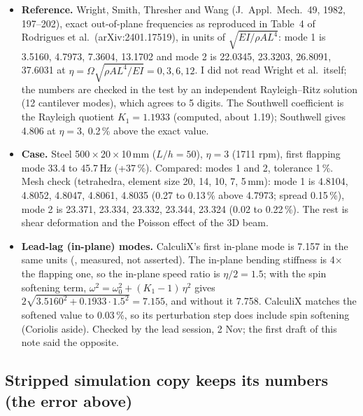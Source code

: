 \begin{itemize}[nosep]
  \item \textbf{Reference.} Wright, Smith, Thresher and Wang (J.\ Appl.\ Mech.\ 49, 1982, 197--202), exact out-of-plane
        frequencies as reproduced in Table~4 of Rodrigues et al.\ (arXiv:2401.17519), in units of
        $\sqrt{EI/\rho A L^4}$: mode 1 is 3.5160, 4.7973, 7.3604, 13.1702 and mode 2 is 22.0345, 23.3203, 26.8091, 37.6031 at
        $\eta=\Omega\sqrt{\rho A L^4/EI}=0,3,6,12$. I did not read Wright et al.\ itself; the numbers are checked
        in the test by an independent Rayleigh--Ritz solution (12 cantilever modes), which agrees to 5 digits.
        The Southwell coefficient is the Rayleigh quotient $K_1=1.1933$ (computed, about 1.19); Southwell gives 4.806 at
        $\eta=3$, 0.2\,\% above the exact value.
  \item \textbf{Case.} Steel 500\,$\times$\,20\,$\times$\,10\,mm ($L/h=50$), $\eta=3$ (1711 rpm), first flapping mode 33.4 to
        45.7\,Hz (+37\,\%). Compared: modes 1 and 2, tolerance 1\,\%. Mesh check (tetrahedra, element size 20, 14, 10, 7, 5\,mm):
        mode 1 is 4.8104, 4.8052, 4.8047, 4.8061, 4.8035 (0.27 to 0.13\,\% above 4.7973; spread 0.15\,\%), mode 2 is 23.371,
        23.334, 23.332, 23.344, 23.324 (0.02 to 0.22\,\%). The rest is shear deformation and the Poisson effect of the 3D beam.
  \item \textbf{Lead-lag (in-plane) modes.} CalculiX's first in-plane mode is 7.157 in the same units (,
        measured, not asserted). The in-plane bending stiffness is 4$\times$ the flapping one, so the in-plane speed
        ratio is $\eta/2=1.5$; with the spin softening term, $\omega^2=\omega_0^2+(K_1-1)\,\eta^2$ gives
        $2\sqrt{3.5160^2+0.1933\cdot1.5^2}=7.155$, and without it 7.758. CalculiX matches the softened value to
        0.03\,\%, so its perturbation step does include spin softening (Coriolis aside). Checked by the lead session, 2 Nov;
        the first draft of this note said the opposite.
\end{itemize}

\subsection*{Stripped simulation copy keeps its numbers (the  error above)}

